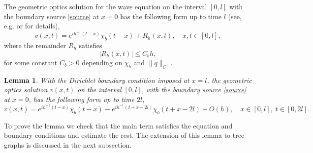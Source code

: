 \documentclass[11pt]{amsart}
\theoremstyle{definition}
\theoremstyle{plain}
\newtheorem{lemma}[definition]{Lemma}
\numberwithin{equation}{section}
\begin{document}
The geometric optics solution for the wave equation on the interval $[0,l]$ with the boundary source \eqref{source} at $x=0$ has the following form up to time $l$ (see, e.g. \cite[Thm. 2.64]{KKL} or \cite{NO,Salo} for details),
\begin{equation}\label{eq_v}
    v(x,t)=e^{ih^{-1}(t-x)}\chi_b(t-x) +R_h(x,t), \quad x,t\in [0,l],
\end{equation}
where the remainder $R_h$ satisfies
\begin{equation} \label{eq-remainder-estimate}
|R_h(x,t)|\leq C_b h,
\end{equation}
for some constant $C_b>0$ depending on $\chi_b$ and $\|q\|_{C^1}$.



\begin{lemma} \label{go-reflect}
With the Dirichlet boundary condition imposed at $x=l$, the geometric optics solution $v(x,t)$ on the interval $[0,l]$, with the boundary source \eqref{source} at $x=0$, has the following form up to time $2l$,
\begin{equation*}\label{eq_v_reflected}
    v(x,t)=e^{ih^{-1}(t-x)}\chi_b(t-x) -e^{ih^{-1}(t+x-2l)}\chi_b(t+x-2l) +O(h), \quad x\in [0,l], \;t\in [0,2l].
\end{equation*}
\end{lemma}

To prove the lemma we check that the main term satisfies the equation and boundary conditions and estimate the rest. The extension of this lemma to tree graphs is discussed in the next subsection.
\end{document}
